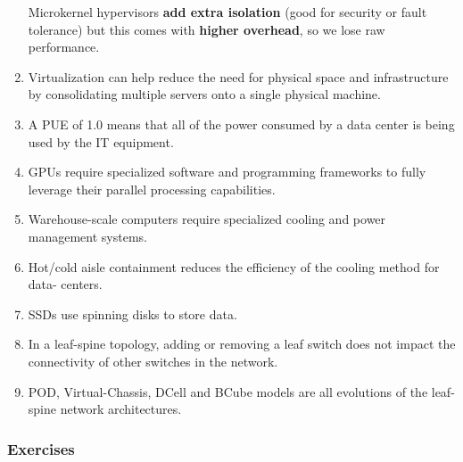 \begin{enumerate}
\begin{deepeningbox}
        Microkernel hypervisors \textbf{add extra isolation} (good for security or fault tolerance) but this comes with \textbf{higher overhead}, so we lose raw performance.
    \end{deepeningbox}
    \item \trueIcon \: Virtualization can help reduce the need for physical space and infrastructure by consolidating multiple servers onto a single physical machine.
    \item \trueIcon \: A PUE of 1.0 means that all of the power consumed by a data center is being used by the IT equipment.
    \item \trueIcon \: GPUs require specialized software and programming frameworks to fully leverage their parallel processing capabilities.
    \item \trueIcon \: Warehouse-scale computers require specialized cooling and power management systems.
    \item \falseIcon \: Hot/cold aisle containment reduces the efficiency of the cooling method for data- centers.
    \item \falseIcon \: SSDs use spinning disks to store data.
    \item \trueIcon \: In a leaf-spine topology, adding or removing a leaf switch does not impact the connectivity of other switches in the network.
    \item \falseIcon \: POD, Virtual-Chassis, DCell and BCube models are all evolutions of the leaf-spine network architectures.
\end{enumerate}

\newpage

\subsubsection*{Exercises}

